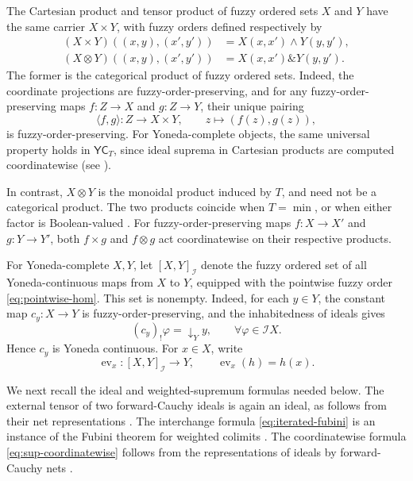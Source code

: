 \documentclass[preprint,3p,times]{elsarticle}
\theoremstyle{definition}
\theoremstyle{remark}
\newcommand{\I}{\mathcal{I}}
\newcommand{\YC}{\mathsf{YC}}
\newcommand{\ev}{\operatorname{ev}}
\newcommand{\tn}{\mathbin{\&}}
\numberwithin{equation}{section}
\begin{document}
The Cartesian product and tensor product of fuzzy ordered sets
\(X\) and \(Y\) have the same carrier \(X\times Y\), with
fuzzy orders defined respectively by
\begin{align}
 (X\times Y)((x,y),(x',y'))
 &=X(x,x')\wedge Y(y,y'),
 \label{eq:cartesian-hom}\\
 (X\otimes Y)((x,y),(x',y'))
 &=X(x,x')\tn Y(y,y').
 \label{eq:tensor-hom}
\end{align}
The former is the categorical product of fuzzy ordered sets.
Indeed, the coordinate projections are fuzzy-order-preserving,
and for any fuzzy-order-preserving maps
\(f\colon Z\to X\) and \(g\colon Z\to Y\), their unique pairing
\[
 \langle f,g\rangle\colon Z\to X\times Y,
 \qquad z\mapsto(f(z),g(z)),
\]
is fuzzy-order-preserving. For Yoneda-complete objects, the same
universal property holds in \(\YC_T\), since ideal suprema in
Cartesian products are computed coordinatewise
(see ).

In contrast, \(X\otimes Y\) is the monoidal product induced by
\(T\), and need not be a categorical product. The two products
coincide when \(T=\min\), or when either factor is Boolean-valued
\cite{LaiLuo2026,Zhang2024}. For fuzzy-order-preserving maps
\(f\colon X\to X'\) and \(g\colon Y\to Y'\), both
\(f\times g\) and \(f\otimes g\) act coordinatewise on their
respective products.

For Yoneda-complete \(X,Y\), let \([X,Y]_{\I}\) denote the
fuzzy ordered set of all Yoneda-continuous maps from \(X\) to
\(Y\), equipped with the pointwise fuzzy order
\eqref{eq:pointwise-hom}. This set is nonempty. Indeed, for each
\(y\in Y\), the constant map \(c_y\colon X\to Y\) is
fuzzy-order-preserving, and the inhabitedness of ideals gives
\[
 (c_y)_!\varphi=\downarrow_Y y,
 \qquad \forall\varphi\in\I X.
\]
Hence \(c_y\) is Yoneda continuous. For \(x\in X\), write
\[
 \ev_x\colon[X,Y]_{\I}\to Y,
 \qquad \ev_x(h)=h(x).
\]

We next recall the ideal and weighted-supremum formulas needed
below. The external tensor of two forward-Cauchy ideals is
again an ideal, as follows from their net representations
\cite[Proposition~9.13 and the discussion preceding
Lemma~14.6]{Zhang2024}. The interchange formula
\eqref{eq:iterated-fubini} is an instance of the Fubini theorem
for weighted colimits
\cite[Section~3.3, Eq.~(3.21)]{Kelly1982}.
The coordinatewise formula \eqref{eq:sup-coordinatewise} follows
from the representations of ideals by forward-Cauchy nets
\cite[Lemma~14.6 and its proof]{Zhang2024}.
\end{document}
